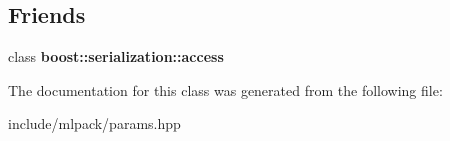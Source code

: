 \subsection*{Friends}
\begin{DoxyCompactItemize}
\item 
\hypertarget{classmlpack_1_1_parameters_ac98d07dd8f7b70e16ccb9a01abf56b9c}{
class {\bfseries boost::serialization::access}}
\label{classmlpack_1_1_parameters_ac98d07dd8f7b70e16ccb9a01abf56b9c}

\end{DoxyCompactItemize}


The documentation for this class was generated from the following file:\begin{DoxyCompactItemize}
\item 
include/mlpack/params.hpp\end{DoxyCompactItemize}
